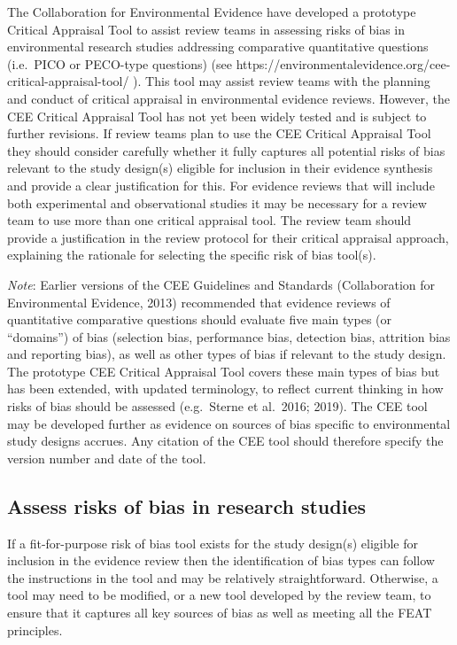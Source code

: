 \documentclass[
  letterpaper,
  DIV=11,
  numbers=noendperiod]{scrreprt}
\begin{document}
The Collaboration for Environmental Evidence have developed a prototype
Critical Appraisal Tool to assist review teams in assessing risks of
bias in environmental research studies addressing comparative
quantitative questions (i.e.~PICO or PECO-type questions) (see
https://environmentalevidence.org/cee-critical-appraisal-tool/ ). This
tool may assist review teams with the planning and conduct of critical
appraisal in environmental evidence reviews. However, the CEE Critical
Appraisal Tool has not yet been widely tested and is subject to further
revisions. If review teams plan to use the CEE Critical Appraisal Tool
they should consider carefully whether it fully captures all potential
risks of bias relevant to the study design(s) eligible for inclusion in
their evidence synthesis and provide a clear justification for this. For
evidence reviews that will include both experimental and observational
studies it may be necessary for a review team to use more than one
critical appraisal tool. The review team should provide a justification
in the review protocol for their critical appraisal approach, explaining
the rationale for selecting the specific risk of bias tool(s).

\emph{Note}: Earlier versions of the CEE Guidelines and Standards
(Collaboration for Environmental Evidence, 2013) recommended that
evidence reviews of quantitative comparative questions should evaluate
five main types (or ``domains'') of bias (selection bias, performance
bias, detection bias, attrition bias and reporting bias), as well as
other types of bias if relevant to the study design. The prototype CEE
Critical Appraisal Tool covers these main types of bias but has been
extended, with updated terminology, to reflect current thinking in how
risks of bias should be assessed (e.g.~Sterne et al.~2016; 2019). The
CEE tool may be developed further as evidence on sources of bias
specific to environmental study designs accrues. Any citation of the CEE
tool should therefore specify the version number and date of the tool.

\subsection{Assess risks of bias in research
studies}\label{assess-risks-of-bias-in-research-studies}

If a fit-for-purpose risk of bias tool exists for the study design(s)
eligible for inclusion in the evidence review then the identification of
bias types can follow the instructions in the tool and may be relatively
straightforward. Otherwise, a tool may need to be modified, or a new
tool developed by the review team, to ensure that it captures all key
sources of bias as well as meeting all the FEAT principles.
\end{document}
